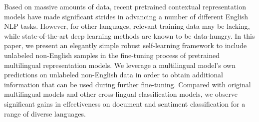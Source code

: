 Based on massive amounts of data, recent pretrained contextual representation models have made significant strides in advancing a number of different English NLP tasks. However, for other languages, relevant training data may be lacking, while state-of-the-art deep learning methods are known to be data-hungry. In this paper, we present an elegantly simple robust self-learning framework to include unlabeled non-English samples in the fine-tuning process of pretrained multilingual representation models. We leverage a multilingual model's own predictions on unlabeled non-English data in order to obtain additional information that can be used during further fine-tuning. Compared with original multilingual models and other cross-lingual classification models, we observe significant gains in effectiveness on document and sentiment classification for a range of diverse languages.
